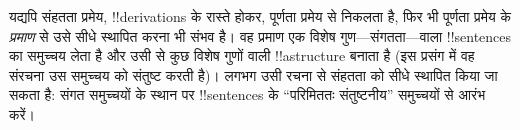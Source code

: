 \documentclass[../../../include/open-logic-section]{subfiles}
\begin{document}
यद्यपि संहतता प्रमेय, !!{derivation}s के रास्ते होकर, पूर्णता प्रमेय से
निकलता है, फिर भी पूर्णता प्रमेय के \emph{प्रमाण} से उसे सीधे स्थापित करना
भी संभव है। वह प्रमाण एक विशेष गुण---संगतता---वाला !!{sentence}s का समुच्चय
लेता है और उसी से कुछ विशेष गुणों वाली !!a{structure} बनाता है (इस प्रसंग
में वह संरचना उस समुच्चय को संतुष्ट करती है)। लगभग उसी रचना से संहतता को सीधे
स्थापित किया जा सकता है: संगत समुच्चयों के स्थान पर !!{sentence}s के
``परिमिततः संतुष्टनीय'' समुच्चयों से आरंभ करें।
\end{document}
